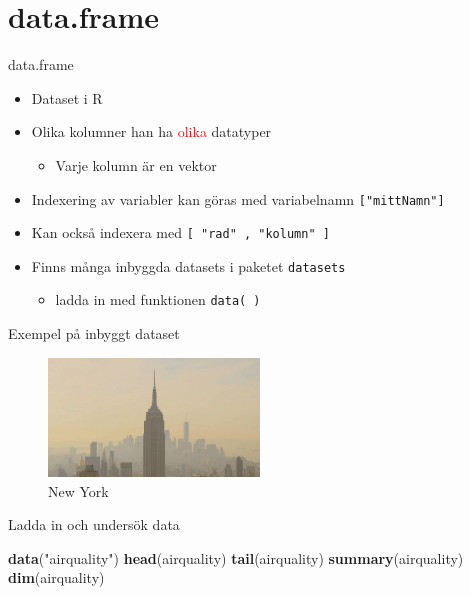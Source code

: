 \documentclass[
  11pt,
  ignorenonframetext,
]{beamer}
\newenvironment{Shaded}{\begin{snugshade}}{\end{snugshade}}
\newcommand{\KeywordTok}[1]{\textcolor[rgb]{0.13,0.29,0.53}{\textbf{#1}}}
\newcommand{\NormalTok}[1]{#1}
\newcommand{\StringTok}[1]{\textcolor[rgb]{0.31,0.60,0.02}{#1}}
\providecommand{\tightlist}{%
  \setlength{\itemsep}{0pt}\setlength{\parskip}{0pt}}
\begin{document}
\hypertarget{data.frame}{%
\section{data.frame}\label{data.frame}}

\begin{frame}{data.frame}
\protect\hypertarget{data.frame-1}{}
\begin{itemize}
\tightlist
\item
  Dataset i R
\item
  Olika kolumner han ha \textcolor{red}{olika} datatyper

  \begin{itemize}
  \tightlist
  \item
    Varje kolumn är en vektor
  \end{itemize}
\item
  Indexering av variabler kan göras med variabelnamn
  \texttt{["mittNamn"]}
\item
  Kan också indexera med \texttt{[ "rad" , "kolumn" ]}
\item
  Finns många inbyggda datasets i paketet \texttt{datasets}

  \begin{itemize}
  \tightlist
  \item
    ladda in med funktionen \texttt{data( )}
  \end{itemize}
\end{itemize}
\end{frame}

\begin{frame}[fragile]{Exempel på inbyggt dataset}
\protect\hypertarget{exempel-puxe5-inbyggt-dataset}{}
\begin{figure}
\centering
\includegraphics[width=0.5\textwidth,height=\textheight]{images/ny.jpeg}
\caption{New York}
\end{figure}

Ladda in och undersök data

\begin{Shaded}
\begin{Highlighting}[]
\KeywordTok{data}\NormalTok{(}\StringTok{"airquality"}\NormalTok{)}
\KeywordTok{head}\NormalTok{(airquality)}
\KeywordTok{tail}\NormalTok{(airquality)}
\KeywordTok{summary}\NormalTok{(airquality)}
\KeywordTok{dim}\NormalTok{(airquality)}
\end{Highlighting}
\end{Shaded}
\end{frame}
\end{document}
